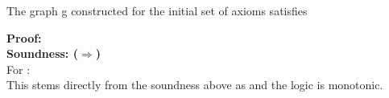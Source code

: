 \begin{theorem}
The graph g constructed for the initial set of axioms  satisfies 

\noindent
\textbf{Proof:} \\
\textbf{Soundness: ($\Rightarrow$)}\\
For  :\\
This stems directly from the soundness above as  and the logic is monotonic.


\end{theorem}
